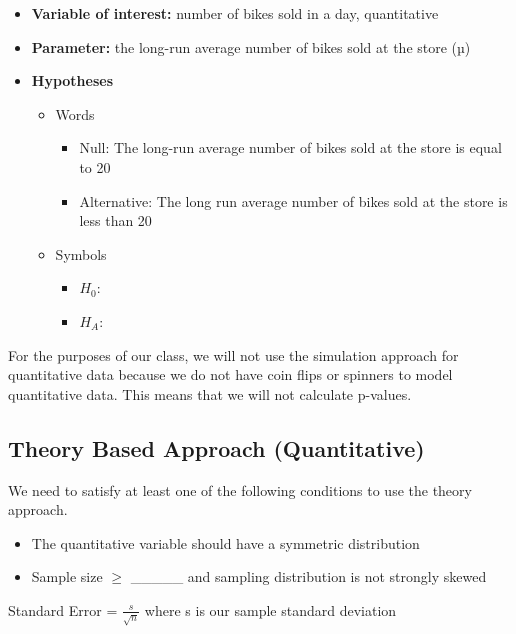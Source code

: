 \documentclass[
  letterpaper,
  DIV=11,
  numbers=noendperiod]{scrartcl}
\begin{document}
\begin{itemize}
\item
  \textbf{Variable of interest:} number of bikes sold in a day,
  quantitative
\item
  \textbf{Parameter:} the long-run average number of bikes sold at the
  store (µ)
\item
  \textbf{Hypotheses}

  \begin{itemize}
  \item
    Words

    \begin{itemize}
    \item
      Null: The long-run average number of bikes sold at the store is
      equal to 20
    \item
      Alternative: The long run average number of bikes sold at the
      store is less than 20
    \end{itemize}
  \item
    Symbols

    \begin{itemize}
    \item
      \(H_{0}:\)
    \item
      \(H_{A}:\)
    \end{itemize}
  \end{itemize}
\end{itemize}

For the purposes of our class, we will not use the simulation approach
for quantitative data because we do not have coin flips or spinners to
model quantitative data. This means that we will not calculate p-values.

\subsection{Theory Based Approach
(Quantitative)}\label{theory-based-approach-quantitative}

We need to satisfy at least one of the following conditions to use the
theory approach.

\begin{itemize}
\item
  The quantitative variable should have a symmetric distribution
\item
  Sample size \(\geq\) \_\_\_\_\_ and sampling distribution is not
  strongly skewed
\end{itemize}

Standard Error = \(\frac{s}{\sqrt{n}}\) where s is our sample standard
deviation
\end{document}
